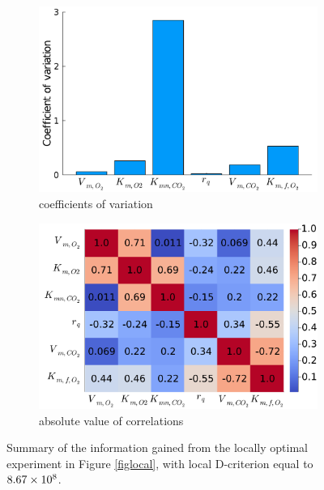 \begin{figure}[h]
	\begin{subfigure}[b]{0.45\textwidth}
		\includegraphics[width=1.0\textwidth]{figure/paper 2/l12_var.pdf}
		\caption{coefficients of variation}
		\label{figlocald}
	\end{subfigure}
	\begin{subfigure}[b]{0.45\textwidth}
		\centering
		\includegraphics[width=1.0\textwidth]{figure/paper 2/l12_corr.pdf}
		\caption{absolute value of correlations}
		\label{figlocale}
	\end{subfigure}
	\caption{Summary of the information gained from the locally optimal experiment in Figure \ref{figlocal}, {\color{red} with local D-criterion equal to $8.67 \times 10^{8}$}.} 
\end{figure}
